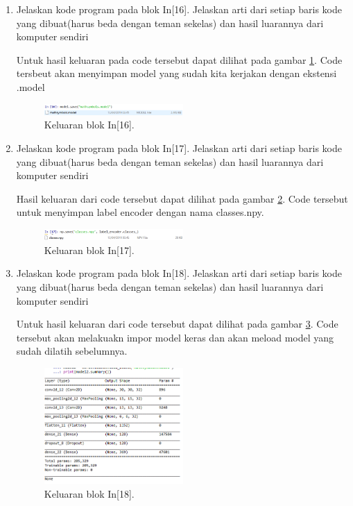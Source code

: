 \begin{enumerate}
\item Jelaskan kode program pada blok In[16]. Jelaskan arti dari setiap baris kode yang dibuat(harus beda dengan teman sekelas) dan hasil luarannya dari komputer sendiri \par

Untuk hasil keluaran pada code tersebut dapat dilihat pada gambar \ref{math16}. Code tersbeut akan menyimpan model yang sudah kita kerjakan dengan ekstensi .model
		\begin{figure}[!htbp]
		\centerline{\includegraphics[width=0.5\textwidth]{figures/im/math16.png}}
		\caption{Keluaran blok In[16].}
		\label{math16}
		\end{figure}

\item Jelaskan kode program pada blok In[17]. Jelaskan arti dari setiap baris kode yang dibuat(harus beda dengan teman sekelas) dan hasil luarannya dari komputer sendiri \par

Hasil keluaran dari code tersebut dapat dilihat pada gambar \ref{math17}. Code tersebut untuk menyimpan label encoder dengan nama classes.npy.
		\begin{figure}[!htbp]
		\centerline{\includegraphics[width=0.5\textwidth]{figures/im/math17.png}}
		\caption{Keluaran blok In[17].}
		\label{math17}
		\end{figure}

\item Jelaskan kode program pada blok In[18]. Jelaskan arti dari setiap baris kode yang dibuat(harus beda dengan teman sekelas) dan hasil luarannya dari komputer sendiri \par

Untuk hasil keluaran dari code tersebut dapat dilihat pada gambar \ref{math18}. Code tersebut akan melakuakn impor model keras dan akan meload model yang sudah dilatih sebelumnya.
		\begin{figure}[!htbp]
		\centerline{\includegraphics[width=0.5\textwidth]{figures/im/math18.png}}
		\caption{Keluaran blok In[18].}
		\label{math18}
		\end{figure}


\end{enumerate}
